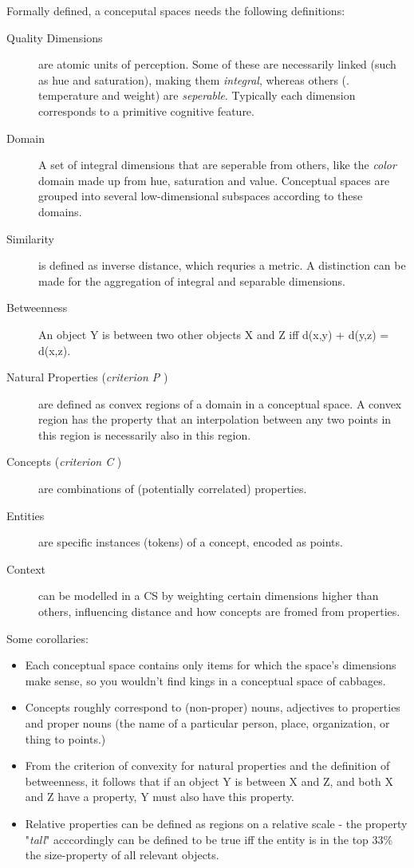 Formally defined, a conceputal spaces needs the following definitions:
\begin{description}
    \item[Quality Dimensions] are atomic units of perception. Some of these are necessarily linked (such as hue and saturation), making them \textit{integral}, whereas others (\eg. temperature and weight) are \textit{seperable}. Typically each dimension corresponds to a primitive cognitive feature.
    \item[Domain] A set of integral dimensions that are seperable from others, like the \textit{color} domain made up from hue, saturation and value. Conceptual spaces are grouped into several low-dimensional subspaces according to these domains.
    \item[Similarity] is defined as inverse distance, which requries a metric. A distinction can be made for the aggregation of integral and separable dimensions. 
    \item[Betweenness] An object Y is between two other objects X and Z iff d(x,y) + d(y,z) = d(x,z).
    \item[Natural Properties (\textit{criterion P} \cite{Gardenfors2000a})] are defined as convex regions of a domain in a conceptual space. A convex region has the property that an interpolation between any two points in this region is necessarily also in this region. 
    \item[Concepts (\textit{criterion C} \cite{Gardenfors2000a})] are combinations of (potentially correlated) properties.  \cite[8]{Gardenfors2004}
    \item[Entities] are specific instances (tokens) of a concept, encoded as points. 
    \item[Context] can be modelled in a CS by weighting certain dimensions higher than others, influencing distance and how concepts are fromed from properties.
\end{description}

Some corollaries: 

\begin{itemize}
    \item Each conceptual space contains only items for which the space's dimensions make sense, so you wouldn't find kings in a conceptual space of cabbages.
    \item Concepts roughly correspond to (non-proper) nouns, adjectives to properties and proper nouns (the name of a particular person, place, organization, or thing to points.)
    \item From the criterion of convexity for natural properties and the definition of betweenness, it follows that if an object Y is between X and Z, and both X and Z have a property, Y must also have this property.
    \item Relative properties can be defined as regions on a relative scale - the property "\textit{tall}" acccordingly can be defined to be true iff the entity is in the top 33\% \wrt the size-property of all relevant objects.
\end{itemize}

